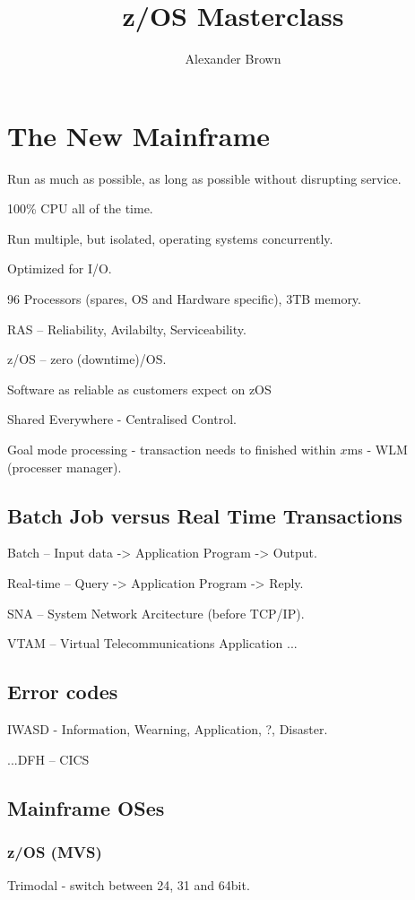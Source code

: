 \documentclass{report}
\title{z/OS Masterclass}
\author{Alexander Brown}
\begin{document}
\maketitle

\section{The New Mainframe}

Run as much as possible, as long as possible without disrupting service.

100\% CPU all of the time.

Run multiple, but isolated, operating systems concurrently.

Optimized for I/O.

96 Processors (spares, OS and Hardware specific), 3TB memory.

RAS -- Reliability, Avilabilty, Serviceability.

z/OS -- zero (downtime)/OS.

Software as reliable as customers expect on zOS

Shared Everywhere - Centralised Control.

Goal mode processing - transaction needs to finished within $x$ms - WLM (processer manager).

\subsection{Batch Job versus Real Time Transactions}

Batch -- Input data -> Application Program -> Output.

Real-time -- Query -> Application Program -> Reply.

SNA -- System Network Arcitecture (before TCP/IP).

VTAM -- Virtual Telecommunications Application ...

\subsection{Error codes}

IWASD - Information, Wearning, Application, ?, Disaster.

...DFH -- CICS

\subsection{Mainframe OSes}

\subsubsection{z/OS (MVS)}
Trimodal - switch between 24, 31 and 64bit.
\end{document}
